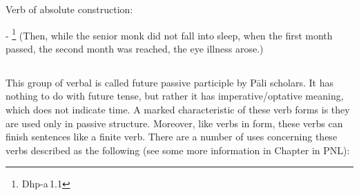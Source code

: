 \begin{compactenum}[(1)]
\item Verb of absolute construction:\par
- \footnote{Dhp-a\,1.1} (Then, while the senior monk did not fall into sleep, when the first month passed, the second month was reached, the eye illness arose.)
\end{compactenum}

{}
\subsection*{}

This group of verbal  is called future passive participle by P\=ali scholars. It has nothing to do with future tense, but rather it has imperative/optative meaning, which does not indicate time. A marked characteristic of these verb forms is they are used only in passive structure. Moreover, like verbs in  form, these verbs can finish sentences like a finite verb. There are a number of uses concerning these verbs described as the following (see some more information in Chapter  in PNL):


